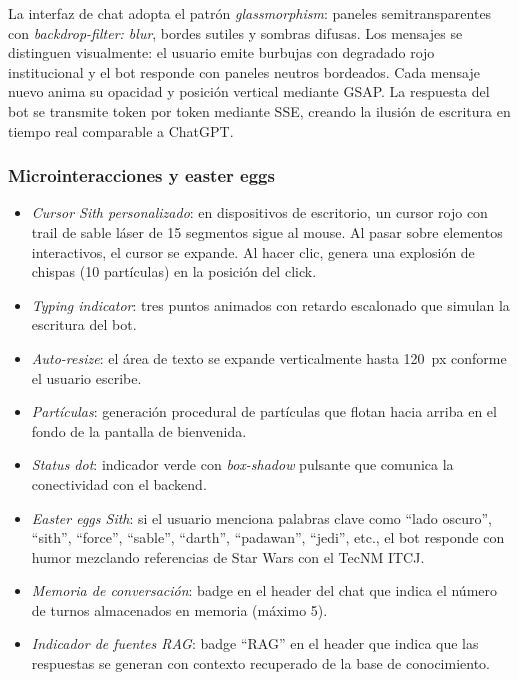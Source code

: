 La interfaz de chat adopta el patrón \textit{glassmorphism}: paneles semitransparentes con \textit{backdrop-filter: blur}, bordes sutiles y sombras difusas. Los mensajes se distinguen visualmente: el usuario emite burbujas con degradado rojo institucional y el bot responde con paneles neutros bordeados. Cada mensaje nuevo anima su opacidad y posición vertical mediante GSAP. La respuesta del bot se transmite token por token mediante SSE, creando la ilusión de escritura en tiempo real comparable a ChatGPT.

\subsubsection{Microinteracciones y easter eggs}

\begin{itemize}
    \item \textit{Cursor Sith personalizado}: en dispositivos de escritorio, un cursor rojo con trail de sable láser de 15 segmentos sigue al mouse. Al pasar sobre elementos interactivos, el cursor se expande. Al hacer clic, genera una explosión de chispas (10 partículas) en la posición del click.
    \item \textit{Typing indicator}: tres puntos animados con retardo escalonado que simulan la escritura del bot.
    \item \textit{Auto-resize}: el área de texto se expande verticalmente hasta 120~px conforme el usuario escribe.
    \item \textit{Partículas}: generación procedural de partículas que flotan hacia arriba en el fondo de la pantalla de bienvenida.
    \item \textit{Status dot}: indicador verde con \textit{box-shadow} pulsante que comunica la conectividad con el backend.
    \item \textit{Easter eggs Sith}: si el usuario menciona palabras clave como ``lado oscuro'', ``sith'', ``force'', ``sable'', ``darth'', ``padawan'', ``jedi'', etc., el bot responde con humor mezclando referencias de Star Wars con el TecNM ITCJ.
    \item \textit{Memoria de conversación}: badge en el header del chat que indica el número de turnos almacenados en memoria (máximo 5).
    \item \textit{Indicador de fuentes RAG}: badge ``RAG'' en el header que indica que las respuestas se generan con contexto recuperado de la base de conocimiento.
\end{itemize}


